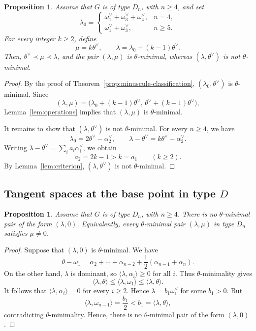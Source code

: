 \documentclass[a4paper, 12pt]{amsart}
\newtheorem{proposition}[theorem]{Proposition}
\theoremstyle{definition}
\begin{document}
\begin{proposition}\label{prop:above-theta}
Assume that $G$ is of type $D_n$, with $n\geq4$, and set
\[
\lambda_0=
\begin{cases}
\omega_1^\vee+\omega_3^\vee+\omega_4^\vee, & n=4,\\[2mm]
\omega_1^\vee+\omega_3^\vee, & n\geq5.
\end{cases}
\]
For every integer $k\geq2$, define
\[
\mu=k\theta^\vee,
\qquad
\lambda=\lambda_0+(k-1)\theta^\vee.
\]
Then,  $\theta^\vee\prec\mu\prec\lambda$, and the pair $(\lambda,\mu)$ is $\theta$-minimal, whereas
$(\lambda,\theta^\vee)$ is not $\theta$-minimal.
\end{proposition}

\begingroup
{}
\begin{proof}
By the proof of Theorem~\ref{prop:minuscule-classification}, $(\lambda_0,\theta^\vee)$ is $\theta$-minimal.
Since
\[
(\lambda,\mu)
=
\bigl(\lambda_0+(k-1)\theta^\vee,\,
      \theta^\vee+(k-1)\theta^\vee\bigr),
\]
Lemma~\ref{lem:operations} implies that $(\lambda,\mu)$ is
$\theta$-minimal. 

It remains to show that $(\lambda,\theta^\vee)$ is not $\theta$-minimal.
For every $n\geq4$, we have
\[
\lambda_0=2\theta^\vee-\alpha_2^\vee,
\qquad
\lambda-\theta^\vee=k\theta^\vee-\alpha_2^\vee.
\]
Writing $\lambda-\theta^\vee=\sum_i a_i\alpha_i^\vee$, we obtain
\[
a_2=2k-1>k=a_1
\qquad(k\geq2).
\]
By Lemma~\ref{lem:criterion}, $(\lambda,\theta^\vee)$ is not
$\theta$-minimal.
\end{proof}
\endgroup


\subsection{Tangent spaces at the base point in type $D$}
\label{subsect:exmaple_theta}

\begin{proposition}\label{prop:no-basepoint-D}
Assume that $G$ is of type $D_n$, with $n\geq 4$.
There is no $\theta$-minimal pair of the form $(\lambda,0)$.
Equivalently, every $\theta$-minimal pair $(\lambda,\mu)$ in type $D_n$
satisfies $\mu\neq 0$.
\end{proposition}

\begin{proof}
Suppose that $(\lambda,0)$ is $\theta$-minimal. We have
\[
\theta-\omega_1
=\alpha_2+\cdots+\alpha_{n-2}
+\frac12(\alpha_{n-1}+\alpha_n).
\]
On the other hand, $\lambda$ is dominant, so
$\langle\lambda,\alpha_i\rangle\geq0$ for all $i$. Thus $\theta$-minimality gives
\[
\langle\lambda,\theta\rangle
\leq\langle\lambda,\omega_1\rangle
\leq\langle\lambda,\theta\rangle.
\]
It follows that $\langle\lambda,\alpha_i\rangle=0$ for every $i\geq2$.
Hence $\lambda=b_1\omega_1^\vee$ for some $b_1>0$. But
\[
\langle\lambda,\omega_{n-1}\rangle
=\frac{b_1}{2}<b_1=\langle\lambda,\theta\rangle,
\]
contradicting $\theta$-minimality. Hence, there is no $\theta$-minimal pair of the form
$(\lambda,0)$.
\end{proof}
\end{document}
